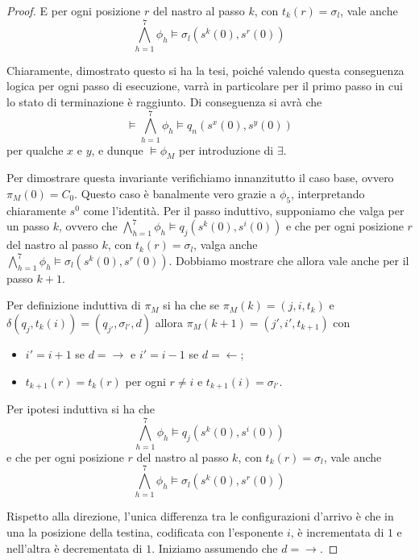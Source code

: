 \begin{proof}
  E per ogni posizione \(r\) del nastro al passo \(k\), con \(t_k(r) = \sigma_l\), vale anche
  \begin{equation}
    \bigwedge_{h=1}^{7} \phi_h \models \sigma_l(s^k(0), s^r(0))
  \end{equation}
  
  Chiaramente, dimostrato questo si ha la tesi, poiché valendo questa conseguenza logica per ogni passo di esecuzione, varrà in particolare per il primo passo in cui lo stato di terminazione è raggiunto. Di conseguenza si avrà che
  \begin{equation}
    \models \bigwedge_{h=1}^{7} \phi_h \models q_n(s^x(0), s^y(0))
  \end{equation}
  per qualche \(x\) e \(y\), e dunque \(\models \phi_M\) per introduzione di \(\exists\).
  
  Per dimostrare questa invariante verifichiamo innanzitutto il caso base, ovvero \(\pi_M(0) = C_0\). Questo caso è banalmente vero grazie a \(\phi_5\), interpretando chiaramente \(s^0\) come l'identità. Per il passo induttivo, supponiamo che valga per un passo \(k\), ovvero che \(\bigwedge_{h=1}^{7} \phi_h \models q_j(s^k(0), s^i(0))\) e che per ogni posizione \(r\) del nastro al passo \(k\), con \(t_k(r) = \sigma_l\), valga anche \(\bigwedge_{h=1}^{7} \phi_h \models \sigma_l(s^k(0), s^r(0))\). Dobbiamo mostrare che allora vale anche per il passo \(k+1\).
  
  Per definizione induttiva di \(\pi_M\) si ha che se \(\pi_M(k) = (j, i, t_k)\) e \(\delta(q_j, t_k(i)) = (q_{j'}, \sigma_{l'}, d)\) allora \(\pi_M(k +1) = (j', i', t_{k+1})\) con
  \begin{itemize}
    \item \(i' = i + 1\) se \(d = \rightarrow\) e \(i' = i - 1\) se \(d = \leftarrow\);
    \item \(t_{k+1}(r) = t_k(r)\) per ogni \(r \neq i\) e \(t_{k+1}(i) = \sigma_{l'}\).
  \end{itemize}
  
  Per ipotesi induttiva si ha che
  \[\bigwedge_{h=1}^{7} \phi_h \models q_j(s^k(0), s^i(0))\]
  e che per ogni posizione \(r\) del nastro al passo \(k\), con \(t_k(r) = \sigma_l\), vale anche
  \[\bigwedge_{h=1}^{7} \phi_h \models \sigma_l(s^k(0), s^r(0))\]
  
  Rispetto alla direzione, l'unica differenza tra le configurazioni d'arrivo è che in una la posizione della testina, codificata con l'esponente \(i\), è incrementata di \(1\) e nell'altra è decrementata di \(1\). Iniziamo assumendo che \(d = \rightarrow\).
  

\end{proof}
